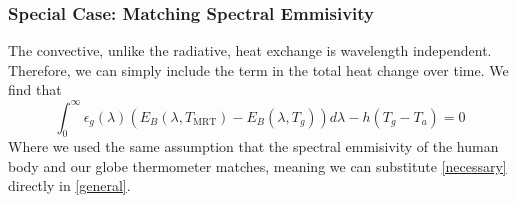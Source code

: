 \documentclass[]{scrartcl}
\begin{document}
\subsubsection{Special Case: Matching Spectral Emmisivity}
The convective, unlike the radiative, heat exchange is wavelength independent. Therefore, we can simply include the term in the total heat change over time. We find that
\begin{equation}
	\boxed{\int_{0}^{\infty}\epsilon_g(\lambda)\left(E_{B}(\lambda, T_{\text{MRT}}) - E_B(\lambda, T_g)\right)d\lambda  - h\left(T_g - T_a\right)= 0}
\end{equation}
Where we used the same assumption that the spectral emmisivity of the human body and our globe thermometer matches, meaning we can substitute \eqref{necessary} directly in \eqref{general}.
\\
\end{document}
